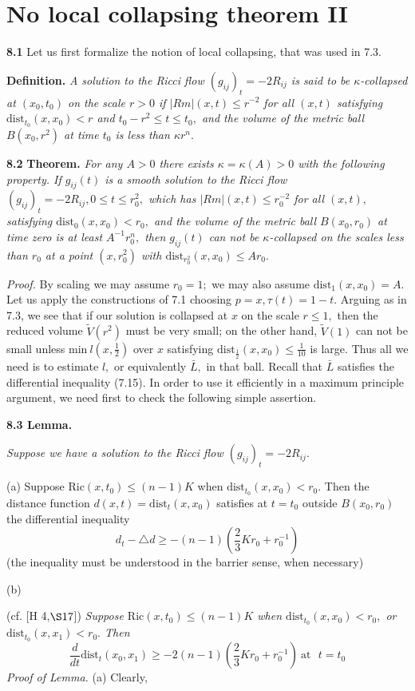 \documentclass[12pt]{article}
\theoremstyle{plain}
{\swapnumbers
\newtheorem{thm}{Theorem}[section]
\newtheorem{cor}[thm]{Corollary}
\newtheorem{lem}[thm]{Lemma}
\newtheorem{prop}[thm]{Proposition}
}
\theoremstyle{definition}
{\swapnumbers
\newtheorem{defn}[thm]{Definition}
\newtheorem{nota}[thm]{Notation}
\newtheorem{parag}[thm]{}
\newtheorem*{parstr}{\addtocounter{thm}{1}\thesection.\arabic{thm}*}
\newtheorem*{intropar}{\addtocounter{thm}{1}\arabic{thm}}
}
\theoremstyle{remark} {\swapnumbers
\newtheorem{rem}[thm]{Remark}
\newtheorem{exam}[thm]{Example}
\newtheorem{lemma}[thm]{Lemma}
\newtheorem{claim}[thm]{Claim}
}
\numberwithin{equation}{section}
\begin{document}
  \section {No local collapsing theorem II} {\bf 8.1} Let us first
 formalize the notion of local collapsing, that was used in 7.3.
 \par {\bf Definition.} {\it A solution to the Ricci flow
 $(g_{ij})_t=-2R_{ij}$ is said to be $\kappa$-collapsed at
 $(x_0,t_0)$ on the scale $r>0$ if $|Rm|(x,t)\le r^{-2}$ for all
 $(x,t)$ satisfying
 $\mbox{dist}_{t_0}(x,x_0)<r$ and $t_0-r^2\le t\le t_0,$ and the
 volume of the metric ball $B(x_0,r^2)$ at time $t_0$ is less than
 $\kappa r^n.$} \par {\bf 8.2} {\bf Theorem.} {\it  For any $A>0$ there exists
 $\kappa=\kappa(A)>0$ with the following property. If $g_{ij}(t)$
 is a smooth solution to the Ricci flow $(g_{ij})_t=-2R_{ij}, 0\le
 t\le r_0^2,$ which has $|Rm|(x,t)\le r_0^{-2}$  for all $(x,t),$
 satisfying $\mbox{dist}_0(x,x_0)<r_0,$ and the volume of the
 metric ball $B(x_0,r_0)$ at time zero is at least $A^{-1}r_0^n,$
 then $g_{ij}(t) $ can not be $\kappa$-collapsed on the scales
 less than $r_0$ at a point $(x,r_0^2)$ with
 $\mbox{dist}_{r_0^2}(x,x_0)\le Ar_0.$}  \par {\it Proof.}  By scaling we
 may assume $r_0=1;$ we may also assume $\mbox{dist}_1(x,x_0)=A.$
 Let us apply the constructions of 7.1 choosing $p=x,
 \tau(t)=1-t.$ Arguing as in 7.3, we see that if our solution is
 collapsed at $x$ on the scale $r\le 1,$ then the reduced volume
 $\tilde{V}(r^2)$ must be very small; on the other hand,
 $\tilde{V}(1)$ can not be small unless $\mbox{min}\
  l(x,\frac{1}{2})$ over $x$ satisfying
 $\mbox{dist}_{\frac{1}{2}}(x,x_0)\le\frac{1}{10}$ is large. Thus
 all we need is to estimate $l,$ or equivalently $\bar{L},$ in
 that ball. Recall that $\bar{L}$ satisfies the differential
 inequality (7.15). In order to use it efficiently in a maximum
 principle argument, we need first to check the following simple
 assertion.
 \par {\bf 8.3 Lemma.} {\it Suppose we have a solution to the Ricci flow
 $(g_{ij})_t=-2R_{ij}.$ \par (a) Suppose  $\mbox{Ric}(x,t_0)\le
 (n-1)K$ when $ \mbox{dist}_{t_0}(x,x_0)<r_0.$ Then the distance
 function $d(x,t)=\mbox{dist}_t(x,x_0)$ satisfies at $t=t_0$ outside $B(x_0,r_0)$ the
 differential inequality $$ d_t-\triangle d\ge
 -(n-1)(\frac{2}{3}Kr_0+r_0^{-1}) $$
 (the inequality must be understood in the barrier sense, when
 necessary)\par (b)} (cf. [H 4,$\S 17$]) {\it  Suppose $\mbox{Ric}(x,t_0)\le (n-1)K$ when $\mbox{dist}_{t_0}(x,x_0)<r_0,$
  or $\mbox{dist}_{t_0}(x,x_1)<r_0.$ Then $$\frac{d}{dt}\mbox{dist}_t(x_0,x_1)\ge
  -2(n-1)(\frac{2}{3}Kr_0+r_0^{-1}) \ \mbox{at}\ \ \ t=t_0$$} {\it Proof of Lemma.} (a)  Clearly,
\end{document}
